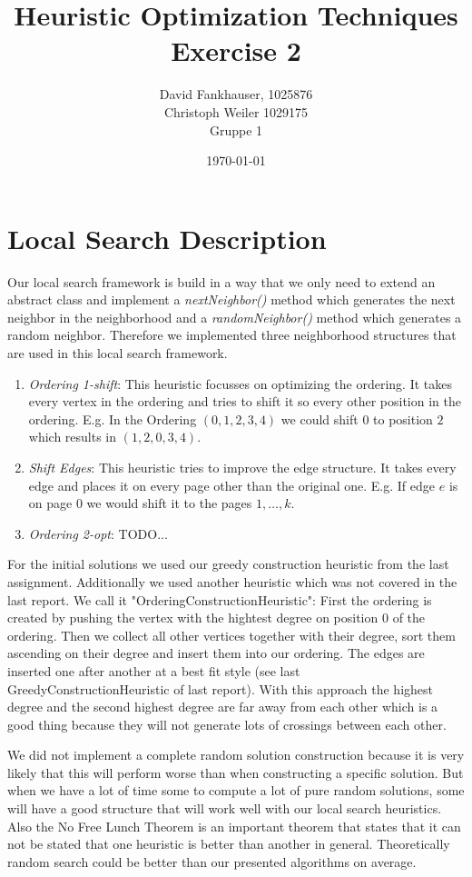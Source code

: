 \documentclass[11pt]{article}
\title{\textbf{Heuristic Optimization Techniques }\\Exercise 2}
\author{David Fankhauser, 1025876\\ Christoph Weiler 1029175\\Gruppe 1}
\date{\today}
\begin{document}
\lstset{language=C++}
\maketitle
 
\section{Local Search Description}
Our local search framework is build in a way that we only need to extend an abstract class and implement a \textit{nextNeighbor()} method which generates the next neighbor in the neighborhood and a \textit{randomNeighbor()} method which generates a random neighbor.
Therefore we implemented three neighborhood structures that are used in this local search framework.

\begin{enumerate}
	\item \textit{Ordering 1-shift}: This heuristic focusses on optimizing the ordering. It takes every vertex in the ordering and tries to shift it so every other position in the ordering.
		E.g. In the Ordering $(0, 1, 2, 3, 4)$ we could shift $0$ to position $2$ which results in $(1, 2, 0, 3, 4)$.
	\item \textit{Shift Edges}: This heuristic tries to improve the edge structure. It takes every edge and places it on every page other than the original one.
		E.g. If edge $e$ is on page $0$ we would shift it to the pages $1, \dots, k$.
	\item \textit{Ordering 2-opt}: TODO...
\end{enumerate}

For the initial solutions we used our greedy construction heuristic from the last assignment.
Additionally we used another heuristic which was not covered in the last report. We call it "OrderingConstructionHeuristic":
First the ordering is created by pushing the vertex with the hightest degree on position $0$ of the ordering.
Then we collect all other vertices together with their degree, sort them ascending on their degree and insert them into our ordering.
The edges are inserted one after another at a best fit style (see last GreedyConstructionHeuristic of last report).
With this approach the highest degree and the second highest degree are far away from each other which is a good thing because they will not generate lots of crossings between each other.

We did not implement a complete random solution construction because it is very likely that this will perform worse than when constructing a specific solution.
But when we have a lot of time some to compute a lot of pure random solutions, some will have a good structure that will work well with our local search heuristics.
Also the No Free Lunch Theorem is an important theorem that states that it can not be stated that one heuristic is better than another in general.
Theoretically random search could be better than our presented algorithms on average.
\end{document}
